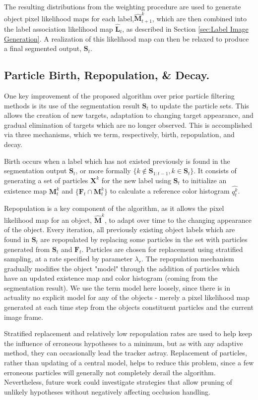 The resulting distributions from the weighting procedure are used to generate object pixel likelihood maps for each label,$\hat{\mathbf{M}}^{k}_{t+1}$, which are then combined into the label association likelihood map $\hat{\mathbf{L}}_t$, as described in Section \ref{sec:Label Image Generation}. A realization of this likelihood map can then be relaxed to produce a final segmented output, $\mathbf{S}_t$. 

\subsection{Particle Birth, Repopulation, \& Decay.}
One key improvement of the proposed algorithm over prior particle filtering methods is its use of the segmentation result $\mathbf{S}_{t}$ to update the particle sets. This allows the creation of new targets, adaptation to changing target appearance, and gradual elimination of targets which are no longer observed. This is accomplished via three mechanisms, which we term, respectively, birth, repopulation, and decay. 

Birth occurs when a label which has not existed previously is found in the segmentation output $\mathbf{S}_{t}$, or more formally $ \{ k\notin \mathbf{S}_{1:t-1}, k\in \mathbf{S}_{t}\}$. It consists of generating a set of particles $\mathbf{X}^k$ for the new label using $\mathbf{S}_{t}$ to initialize an existence map $\mathbf{M}^k_t$ and $\{\mathbf{F}_{t} \cap \mathbf{M}^k_t \}$ to calculate a reference color histogram $\hat{\mathit{q}^k_t}$.

Repopulation is a key component of the algorithm, as it allows the pixel likelihood map for an object, $\mathbf{\hat{M}}^k$, to adapt over time to the changing appearance of the object. Every iteration, all previously existing object labels which are found in $\mathbf{S}_{t}$ are repopulated by replacing some particles in the set with particles generated from $\mathbf{S}_{t}$ and $\mathbf{F}_{t}$. Particles are chosen for replacement using stratified sampling, at a rate specified by parameter $\lambda_r$. The repopulation mechanism gradually modifies the object "model" through the addition of particles which have an updated existence map and color histogram (coming from the segmentation result). We use the term model here loosely, since there is in actuality no explicit model for any of the objects - merely a pixel likelihood map generated at each time step from the objects constituent particles and the current image frame. 

Stratified replacement and relatively low repopulation rates are used to help keep the influence of erroneous hypotheses to a minimum, but as with any adaptive method, they can occasionally lead the tracker astray. Replacement of particles, rather than updating of a central model, helps to reduce this problem, since a few erroneous particles will generally not completely derail the algorithm. Nevertheless, future work could investigate strategies that allow pruning of unlikely hypotheses without negatively affecting occlusion handling. 

